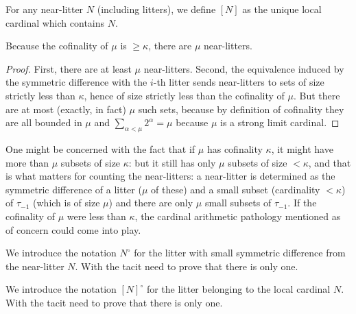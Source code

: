 \begin{definition}
\label {def:local-cardinal-of}
For any near-litter $N$ (including litters), we define $[N]$ as the unique local cardinal which contains $N$.
\end{definition}

\begin{lemma}
\label {lem:count-near-litters}
\leanok
{}

Because the cofinality of $\mu$ is $\geq \kappa$, there are $\mu$ near-litters.
\end{lemma}

\begin{proof}
\leanok
First, there are at least $\mu$ near-litters. Second, the equivalence induced by the symmetric difference with the $i$-th litter sends near-litters to sets of size strictly less than $\kappa$, hence of size strictly less than the cofinality of $\mu$. But there are at most (exactly, in fact) $\mu$ such sets, because by definition of cofinality they are all bounded in $\mu$ and $\sum_{\alpha < \mu} 2 ^ \alpha = \mu $ because $\mu$ is a strong limit cardinal.
\end{proof}

One might be concerned with the fact that if $\mu$ has cofinality $\kappa$, it might have more than $\mu$ subsets of size $\kappa$:  but it still has only $\mu$ subsets of size $<\kappa$, and that is what matters for counting the near-litters:  a near-litter is determined as the symmetric difference of a litter ($\mu$ of these) and a small subset (cardinality $<\kappa$) of $\tau_{-1}$ (which is of size $\mu$) and there are only $\mu$ small subsets of $\tau_{-1}$.  If the cofinality of $\mu$ were less than $\kappa$, the cardinal arithmetic pathology mentioned as of concern could come into play.

\begin{definition}
\label {def:the-litter-near}
We introduce the notation $N^\circ$ for the litter with small symmetric difference from the near-litter $N$.
With the tacit need to prove that there is only one.
\end{definition}

\begin{definition}
\label {def:the-litter-in}
We introduce the notation $[N]^\circ$ for the litter belonging to the local cardinal $N$.  With the tacit need to prove that there is only one.
\end{definition}

